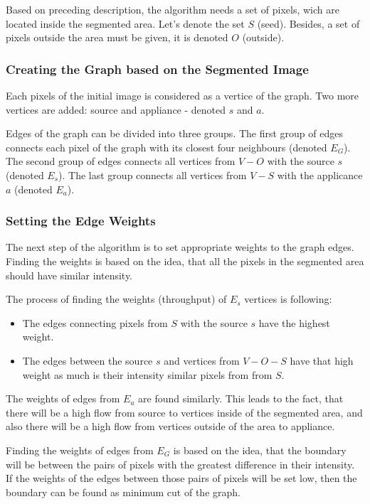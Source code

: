 Based on preceding description, the algorithm needs a set of pixels, wich are located inside the segmented area. Let's denote the set $S$ (seed). Besides, a set of pixels outside the area must be given, it is denoted $O$ (outside).

\subsubsection{Creating the Graph based on the Segmented Image}
Each pixels of the initial image is considered as a vertice of the graph. Two more vertices are added: source and appliance - denoted $s$ and $a$.

Edges of the graph can be divided into three groups. The first group of edges connects each pixel of the graph with its closest four neighbours (denoted $E_{G}$). The second group of edges connects all vertices from $V - O$ with the source $s$ (denoted $E_{s}$). The last group connects all vertices from $V - S$ with the applicance $a$ (denoted $E_{a}$).

\subsubsection{Setting the Edge Weights}
The next step of the algorithm is to set appropriate weights to the graph edges. Finding the weights is based on the idea, that all the pixels in the segmented area should have similar intensity. 

The process of finding the weights (throughput) of $E_{s}$ vertices is following:
\begin{itemize}
\item The edges connecting pixels from $S$ with the source $s$ have the highest weight.
\item The edges between the source $s$ and vertices from $V - O - S$ have that high weight as much is their intensity similar pixels from from $S$.
\end{itemize}
The weights of edges from $E_{a}$ are found similarly. This leads to the fact, that there will be a high flow from source to vertices inside of the segmented area, and also there will be a high flow from vertices outside of the area to appliance.

Finding the weights of edges from $E_{G}$ is based on the idea, that the boundary will be between the pairs of pixels with the greatest difference in their intensity. If the weights of the edges between those pairs of pixels will be set low, then the boundary can be found as minimum cut of the graph.

